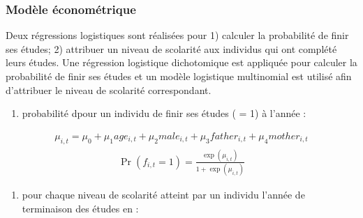 \documentclass[letterpaper,10pt,french]{sphinxmanual}
\begin{document}
\subsubsection{Modèle économétrique}
\label{\detokenize{methodologie:model2}}\label{\detokenize{methodologie:id1}}
Deux régressions logistiques sont réalisées pour 1) calculer la probabilité de finir ses études; 2) attribuer un niveau de scolarité aux individus qui ont complété leurs études. Une régression logistique dichotomique est appliquée pour calculer la probabilité de finir ses études et un modèle logistique multinomial est utilisé afin d’attribuer le niveau de scolarité correspondant.
\begin{enumerate}
%
\item {} 
probabilité dpour un individu  de finir ses études ( = 1) à l’année :

\end{enumerate}
\begin{equation*}
\begin{split}\mu_{i,t} = \mu_{0} + \mu_{1} age_{i,t} + \mu_{2} male_{i,t} + \mu_{3} father_{i,t} + \mu_{4} mother_{i,t}\end{split}
\end{equation*}\begin{equation*}
\begin{split}\Pr(f_{i,t}=1) = \frac{\exp(\mu_{i,t})}{1+\exp(\mu_{i,t})}\end{split}
\end{equation*}\begin{enumerate}
%
\setcounter{enumi}{1}
\item {} 
pour chaque niveau de scolarité  atteint par un individu  l’année de terminaison des études en :

\end{enumerate}
\end{document}
